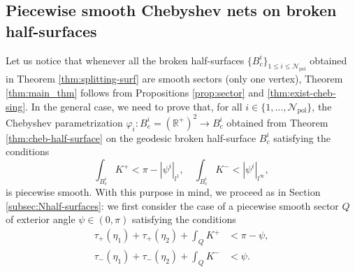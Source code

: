 \documentclass{article}
\newcommand{\argmax}{\operatornamewithlimits{argmax}}
\newcommand{\R}{\mathbb{R}}
\newcommand{\sect}{Q}
\newcommand{\halfP}{B}
\newcommand{\Npiece}{\mathcal{N}_{\mathrm{piece}}}
\newcommand{\Npol}{\mathcal{N}_{\mathrm{pol}}}
\theoremstyle{remark}
\newtheorem{remarkE}[theorem]{Remark}
\theoremstyle{prpart}
\begin{document}
\subsection{Piecewise smooth Chebyshev nets on broken half-surfaces}\label{subsubsec:half-surfaces-smooth-cheb}
Let us notice that whenever all the broken half-surfaces $\{\halfP^i_c\}_{1\leq i\leq\Npol}$ obtained in Theorem \ref{thm:splitting-surf} are smooth sectors (only one vertex), Theorem \ref{thm:main_thm} follows from Propositions \ref{prop:sector} and \ref{thm:exist-cheb-sing}. In the general case, we need to prove that, for all $i\in\{1,...,\Npol\}$, the Chebyshev parametrization $\varphi_i:\halfP_e^i=(\R^+)^2\to \halfP_c^i$ obtained from Theorem \ref{thm:cheb-half-surface} on the geodesic broken half-surface $\halfP^i_c$ satisfying the conditions
\begin{equation} \label{eq:cond-geod-half-surf}
  \int_{\halfP^i_c} K^+ < \pi-|\psi^i|_{l^1}, \quad\int_{\halfP^i_c} K^- < |\psi^i|_{l^\infty},
\end{equation} 
is piecewise smooth. With this purpose in mind, we proceed as in Section \ref{subsec:Nhalf-surfaces}: we first consider the case of a piecewise smooth sector $\sect$ of exterior angle $\psi\in(0,\pi)$ satisfying the conditions
\begin{subequations}\label{eq:cond-sectorb}
    \begin{alignat}{2}  \label{eq:cond-sectorb1}
     \tau_+(\eta_1) + \tau_+(\eta_2) + \int_\sect K^+ &< \pi-\psi,  \\
     \tau_-(\eta_1) + \tau_-(\eta_2) + \int_\sect K^- &< \psi. \label{eq:cond-sectorb2}
  \end{alignat}
\end{subequations}


\end{document}

